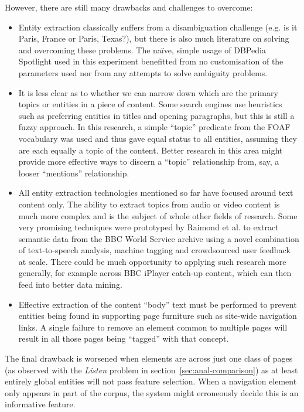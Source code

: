 However, there are still many drawbacks and challenges to overcome:

\begin{itemize}
\item Entity extraction classically suffers from a disambiguation
  challenge (e.g. is it Paris, France or Paris, Texas?), but there
  is also much literature on solving and overcoming these problems.
  The na\"ive, simple usage of DBPedia Spotlight used in this
  experiment benefitted from no customisation of the parameters used
  nor from any attempts to solve ambiguity problems.
\item It is less clear as to whether we can narrow down which
  are the primary topics or entities in a piece of content. Some
  search engines use heuristics such as preferring entities in
  titles and opening paragraphs, but this is still a fuzzy approach.
  In this research, a simple ``topic'' predicate from the FOAF
  vocabulary was used and thus gave equal status to all entities,
  assuming they are each equally a topic of the content. Better
  research in this area might provide more effective ways to discern
  a ``topic'' relationship from, say, a looser ``mentions''
  relationship.
\item All entity extraction technologies mentioned so far have
  focused around text content only. The ability to extract topics
  from audio or video content is much more complex and is the subject
  of whole other fields of research. Some very promising techniques
  were prototyped by Raimond et al.\cite{raimond2014bbc} to extract
  semantic data from the BBC World Service archive using a novel
  combination of text-to-speech analysis, machine tagging and
  crowdsourced user feedback at scale. There could be much
  opportunity to applying such research more generally, for example
  across BBC iPlayer catch-up content, which can then feed into
  better data mining.
\item Effective extraction of the content ``body'' text must be
  performed to prevent entities being found in supporting page
  furniture such as site-wide navigation links. A single failure to
  remove an element common to multiple pages will result in all
  those pages being ``tagged'' with that concept. 
\end{itemize}

The final drawback is worsened
when elements are across just one class of pages (as observed with
the \emph{Listen} problem in section~\ref{sec:anal-comparison}) as
at least entirely global entities will not pass feature selection.
When a navigation element only appears in part of the corpus, the
system might erroneously decide this is an informative feature.

